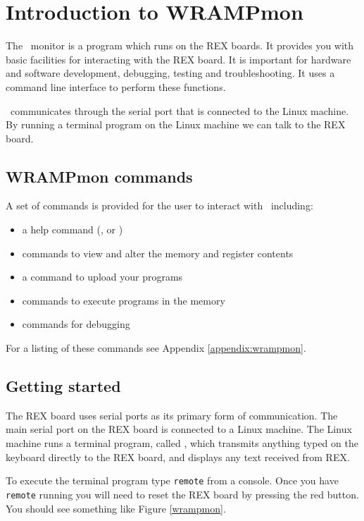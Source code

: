 %
%
%
\section{Introduction to WRAMPmon}
\label{intro:wrampmon}

The \WRAMPmon\ monitor is a program which runs on the REX boards.  It
provides you with basic facilities for interacting with the REX board.
It is important for hardware and software development, debugging,
testing and troubleshooting.  It uses a command line interface to
perform these functions.

\WRAMPmon\ communicates through the serial port that is connected to the Linux 
machine.  By running a terminal program on the Linux machine we can talk
to the REX board.


\subsection{WRAMPmon commands}
A set of commands is provided for the user to interact with \WRAMPmon\
including:

\begin{itemize}
\item a help command (, or )
\item commands to view and alter the memory and register contents
\item a command to upload your programs
\item commands to execute programs in the memory
\item commands for debugging
\end{itemize}

For a listing of these commands see Appendix \ref{appendix:wrampmon}.

\subsection{Getting started}
The REX board uses serial ports as its primary form of communication.
The main serial port on the REX board is connected to a Linux
machine. The Linux machine runs a terminal program, called
, which transmits anything typed on the keyboard
directly to the REX board, and displays any text received from REX.

To execute the terminal program type \verb|remote| from a console.
Once you have \verb|remote| running you will need to reset the REX
board by pressing the red \src{RESET} button.  You should see
something like Figure \ref{wrampmon}.

